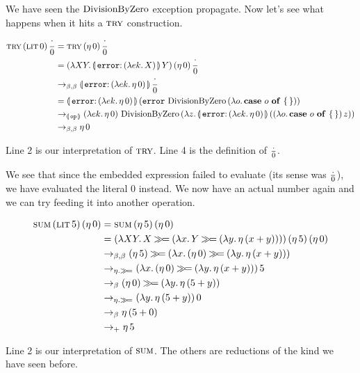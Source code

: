 We have seen the $\operatorname{DivisionByZero}$ exception propagate. Now let's see what
happens when it hits a $\textsc{try}$ construction.

\begin{align*}
  \app{\trye}{\litec{0}}{\dbze}
  &= \app{\trye}{(\ap{\eta}{0})}{\dbze} \\
  &= \app{(\lam{X Y}{\ap{\banana{\onto{\op{error}}{(\lam{e k}{X})}}}{Y}})}{(\ap{\eta}{0})}{\dbze} \\
  &\to_{\beta,\beta} \ap{\banana{\onto{\op{error}}{(\lam{e k}{\ap{\eta}{0}})}}}{\dbze} \\
  &= \ap{\banana{\onto{\op{error}}{(\lam{e k}{\ap{\eta}{0}})}}}{(\app{\op{error}}{\dbzelong}{(\lam{o}{\absurd{o}})})} \\
  &\to_{\banana{\op{op}}} \app{(\lam{e k}{\ap{\eta}{0}})}{\dbzelong}{(\lam{z}{\ap{\banana{\onto{\op{error}}{(\lam{e k}{\ap{\eta}{0}})}}}{(\ap{(\lam{o}{\absurd{o}})}{z})}})} \\
  &\to_{\beta,\beta} \ap{\eta}{0}
\end{align*}

Line 2 is our interpretation of $\textsc{try}$. Line 4 is the definition of
$\frac{\cdot}{0}$.

We see that since the embedded expression failed to evaluate (its sense was
$\frac{\cdot}{0}$), we have evaluated the literal 0 instead. We now have an actual
number again and we can try feeding it into another operation.

\begin{align*}
  \app{\sume}{\litec{5}}{(\ap{\eta}{0})}
  &= \app{\sume}{(\ap{\eta}{5})}{(\ap{\eta}{0})} \\
  &= \app{(\lam{X Y}{X \hsbind (\lam{x}{Y \hsbind (\lam{y}{\ap{\eta}{(x + y)}})})})}{(\ap{\eta}{5})}{(\ap{\eta}{0})} \\
  &\to_{\beta,\beta} (\ap{\eta}{5}) \hsbind (\lam{x}{(\ap{\eta}{0}) \hsbind (\lam{y}{\ap{\eta}{(x + y)}})}) \\
  &\to_{\eta.\hsbind} \ap{(\lam{x}{(\ap{\eta}{0}) \hsbind (\lam{y}{\ap{\eta}{(x + y)}})})}{5} \\
  &\to_{\beta} (\ap{\eta}{0}) \hsbind (\lam{y}{\ap{\eta}{(5 + y)}}) \\
  &\to_{\eta.\hsbind} \ap{(\lam{y}{\ap{\eta}{(5 + y)}})}{0} \\
  &\to_{\beta} \ap{\eta}{(5 + 0)} \\
  &\to_+ \ap{\eta}{5}
\end{align*}

Line 2 is our interpretation of $\textsc{sum}$. The others are reductions of the
kind we have seen before.

